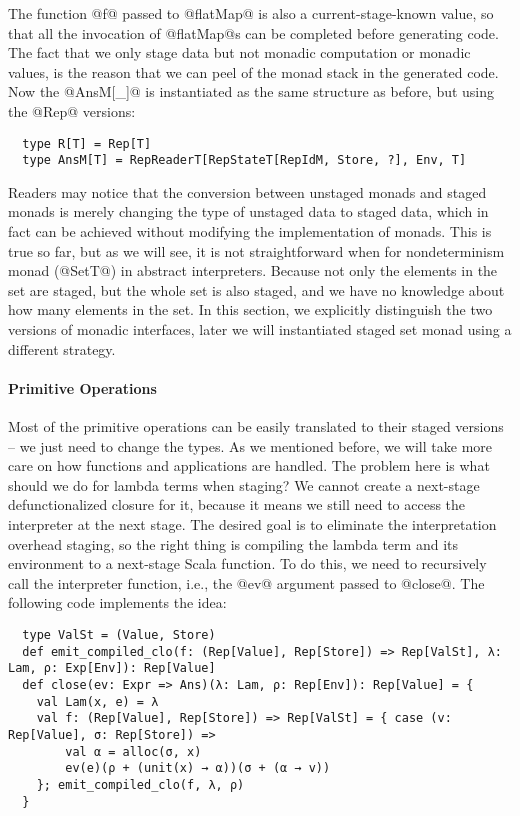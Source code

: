 The function @f@ passed to @flatMap@ is also a current-stage-known value, so
that all the invocation of @flatMap@s can be completed before generating code.
The fact that we only stage data but not monadic computation or monadic
values, is the reason that we can peel of the monad stack in the generated code.
Now the @AnsM[_]@ is instantiated as the same structure as before, but using the
@Rep@ versions:
\begin{lstlisting}
  type R[T] = Rep[T]
  type AnsM[T] = RepReaderT[RepStateT[RepIdM, Store, ?], Env, T]
\end{lstlisting}

Readers may notice that the conversion between unstaged monads and staged monads
is merely changing the type of unstaged data to staged data, which in fact can
be achieved without modifying the implementation of monads. This is true so far,
but as we will see, it is not straightforward when for nondeterminism monad
(@SetT@) in abstract interpreters. Because not only the elements in the set are
staged, but the whole set is also staged, and we have no knowledge about how
many elements in the set. In this section, we explicitly distinguish the two
versions of monadic interfaces, later we will instantiated staged set monad
using a different strategy.

\paragraph{Primitive Operations} Most of the primitive operations can be easily
translated to their staged versions -- we just need to change the types.
As we mentioned before, we will take more care on how functions and
applications are handled. The problem here is what should we do for
lambda terms when staging? We cannot create a next-stage
defunctionalized closure for it, because it means we still need to
access the interpreter at the next stage. The desired goal is to eliminate the
interpretation overhead staging, so the right thing is compiling the lambda term
and its environment to a next-stage Scala function. To do this, we need to
recursively call the interpreter function, i.e., the @ev@ argument passed to @close@.
The following code implements the idea:
\begin{lstlisting}
  type ValSt = (Value, Store)
  def emit_compiled_clo(f: (Rep[Value], Rep[Store]) => Rep[ValSt], λ: Lam, ρ: Exp[Env]): Rep[Value]
  def close(ev: Expr => Ans)(λ: Lam, ρ: Rep[Env]): Rep[Value] = {
    val Lam(x, e) = λ
    val f: (Rep[Value], Rep[Store]) => Rep[ValSt] = { case (v: Rep[Value], σ: Rep[Store]) =>
        val α = alloc(σ, x)
        ev(e)(ρ + (unit(x) → α))(σ + (α → v))
    }; emit_compiled_clo(f, λ, ρ)
  }
\end{lstlisting}


